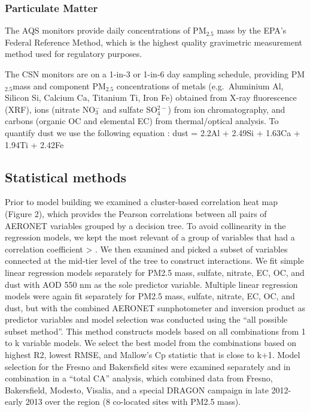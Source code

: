 \documentclass[, manuscript]{copernicus}
\begin{document}
\subsubsection{Particulate Matter}

The AQS monitors provide daily concentrations of PM\(_{2.5}\) mass by
the EPA's Federal Reference Method, which is the highest quality
gravimetric measurement method used for regulatory purposes.

The CSN monitors are on a 1-in-3 or 1-in-6 day sampling schedule,
providing PM\(_{2.5}\)mass and component PM\(_{2.5}\) concentrations of
metals (e.g.~Aluminium Al, Silicon Si, Calcium Ca, Titanium Ti, Iron Fe)
obtained from X-ray fluorescence (XRF), ions (nitrate NO\(_{3}^-\) and
sulfate SO\(_4^{2-}\)) from ion chromatography, and carbons (organic OC
and elemental EC) from thermal/optical analysis. To quantify dust we use
the following equation \cite{Chow2015}: dust = 2.2Al + 2.49Si + 1.63Ca +
1.94Ti + 2.42Fe

\subsection{Statistical methods}

Prior to model building we examined a cluster-based correlation heat map
(Figure 2), which provides the Pearson correlations between all pairs of
AERONET variables grouped by a decision tree. To avoid collinearity in
the regression models, we kept the most relevant of a group of variables
that had a correlation coefficient \textgreater{} \textbar.
We then examined and picked a subset of variables connected at the
mid-tier level of the tree to construct interactions. We fit simple
linear regression models separately for PM2.5 mass, sulfate, nitrate,
EC, OC, and dust with AOD 550 nm as the sole predictor variable.
Multiple linear regression models were again fit separately for PM2.5
mass, sulfate, nitrate, EC, OC, and dust, but with the combined AERONET
sunphotometer and inversion product as predictor variables and model
selection was conducted using the ``all possible subset method''. This
method constructs models based on all combinations from 1 to k variable
models. We select the best model from the combinations based on highest
R2, lowest RMSE, and Mallow's Cp statistic that is close to k+1. Model
selection for the Fresno and Bakersfield sites were examined separately
and in combination in a ``total CA'' analysis, which combined data from
Fresno, Bakersfield, Modesto, Visalia, and a special DRAGON campaign in
late 2012-early 2013 over the region (8 co-located sites with PM2.5
mass).
\end{document}

